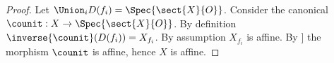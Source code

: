 
\begin{proof}
Let $\Union_i D(f_i) = \Spec{\sect{X}{O}}$.
Consider the canonical $\counit: X\rightarrow \Spec{\sect{X}{O}}$.
By definition $\inverse{\counit}(D(f_i)) = X_{f_i}$.
By assumption $X_{f_i}$ is affine.
By \cite[\href{http://stacks.math.columbia.edu/tag/01S8}{Tag 01S8}]{stacks}]
the morphism $\counit$ is affine, hence $X$ is affine.
\end{proof}